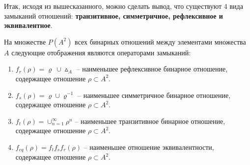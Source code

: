 \documentclass[bachelor, och, labwork]{shiza}
\begin{document}




    
    
    
    

Итак, исходя из вышесказанного, можно сделать вывод, что существуют 4 вида 
замыканий отношений: \textbf{транзитивное, симметричное, рефлексивное и
эквивалентное}.

На множестве $P(A^2)$ всех бинарных отношений между элементами множества $A$ 
следующие отображения являются операторами замыканий:
\begin{enumerate}
    \item $f_r(\rho) = \varrho ~\cup \vartriangle_A$ -- наименьшее рефлексивное
    бинарное отношение, содержащее отношение $\rho \subset A^2$. 
    \item $f_s(\rho) = \varrho \cup \varrho^{-1}$ -- наименьшее симметричное
    бинарное отношение, содержащее отношение $\rho \subset A^2$.
    \item $f_t(\rho) = \cup^{\infty}_{n=1} \rho^n$ -- наименьшее транзитивное
    бинарное отношение, содержащее отношение $\rho \subset A^2$.
    \item $f_{eq}(\rho) = f_tf_sf_r(\rho)$ -- наименьшее отношение эквивалентности,
    содержащее отношение $\rho \subset A^2$.
    
\end{enumerate}
\end{document}
